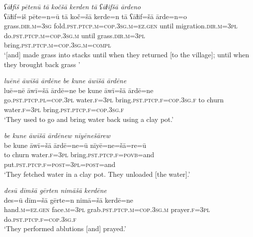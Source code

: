 \ea \label{ŽE.13}
\textit{ʕāɫfiš pētenū tā kočšā kerden tā ʕāɫifšā ārdeno} \\ 
\gll ʕāɫif=iš pēte=n=ū tā koč=šā kerde=n tā ʕāɫif=šā ārde=n=o \\ 
 grass\textsc{.dir}\textsc{.m}\textsc{=3sg} fold\textsc{.pst}\textsc{.ptcp}\textsc{.m}\textsc{=cop}\textsc{.3sg}\textsc{.m}\textsc{\textsc{=ez.gen}} until migration\textsc{.dir}\textsc{.m}\textsc{=3pl} do\textsc{.pst}\textsc{.ptcp}\textsc{.m}\textsc{=cop}\textsc{.3sg}\textsc{.m} until grass\textsc{.dir}\textsc{.m}\textsc{=3pl} bring\textsc{.pst}\textsc{.ptcp}\textsc{.m}\textsc{=cop}\textsc{.3sg}\textsc{.m}\textsc{=compl} \\ 
\glt `[and] made grass into stacks until when they returned [to the village]; until when they brought back grass '
\z 
 
\ea \label{ŽE.16}
\textit{luēnē āwīšā ārdēne be kune āwīšā ārdēne} \\ 
\gll luē=nē āwī=šā ārdē=ne be kune āwī=šā ārdē=ne \\ 
 go\textsc{.pst}\textsc{.ptcp}\textsc{.pl}\textsc{=cop}\textsc{.3pl} water\textsc{.f}\textsc{=3pl} bring\textsc{.pst}\textsc{.ptcp}\textsc{.f}\textsc{=cop}\textsc{.3sg}\textsc{.f} to churn water\textsc{.f}\textsc{=3pl} bring\textsc{.pst}\textsc{.ptcp}\textsc{.f}\textsc{=cop}\textsc{.3sg}\textsc{.f} \\ 
\glt `They used to go and bring water back using a clay pot.'
\z 
 
\ea \label{ŽE.17}
\textit{be kune āwīšā ārdēnew nīyēnešārew} \\ 
\gll be kune āwī=šā ārdē=ne=ū nīyē=ne=šā=re=ū \\ 
 to churn water\textsc{.f}\textsc{=3pl} bring\textsc{.pst}\textsc{.ptcp}\textsc{.f}\textsc{=\textsc{povb}}=and put\textsc{.pst}\textsc{.ptcp}\textsc{.f}\textsc{=\textsc{post}}\textsc{=3pl}\textsc{=\textsc{post}}=and \\ 
\glt `They fetched water in a clay pot. They unloaded [the water].'
\z 
 
\ea \label{ŽE.18}
\textit{desū dīmšā gērten nimāšā kerdēne} \\ 
\gll des=ū dīm=šā gērte=n nimā=šā kerdē=ne \\ 
 hand\textsc{.m}\textsc{\textsc{=ez.gen}} face\textsc{.m}\textsc{=3pl} grab\textsc{.pst}\textsc{.ptcp}\textsc{.m}\textsc{=cop}\textsc{.3sg}\textsc{.m} prayer\textsc{.f}\textsc{=3pl} do\textsc{.pst}\textsc{.ptcp}\textsc{.f}\textsc{=cop}\textsc{.3sg}\textsc{.f} \\ 
\glt `They performed ablutions [and] prayed.'
\z 
 
